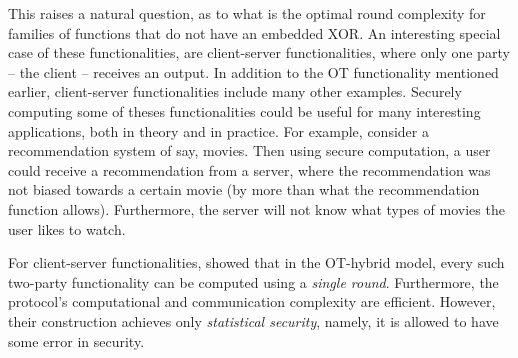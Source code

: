 \documentclass{llncs}
\begin{document}
This raises a natural question, as to what is the optimal round complexity for families of functions that do not have an embedded XOR. An interesting special case of these functionalities, are client-server functionalities, where only one party -- the client -- receives an output. 
In addition to the OT functionality mentioned earlier, client-server functionalities include many other examples. Securely computing some of theses functionalities could be useful for many interesting applications, both in theory and in practice. For example, consider a recommendation system of say, movies. Then using secure computation, a user could receive a recommendation from a server, where the recommendation was not biased towards a certain movie (by more than what the recommendation function allows). Furthermore, the server will not know what types of movies the user likes to watch.

For client-server functionalities, \citet{IKOPS11} showed that in the OT-hybrid model, every such two-party functionality can be computed using a \emph{single round}. Furthermore, the protocol's computational and communication complexity are efficient. However, their construction achieves only \emph{statistical security}, namely, it is allowed to have some error in security. 
\end{document}
